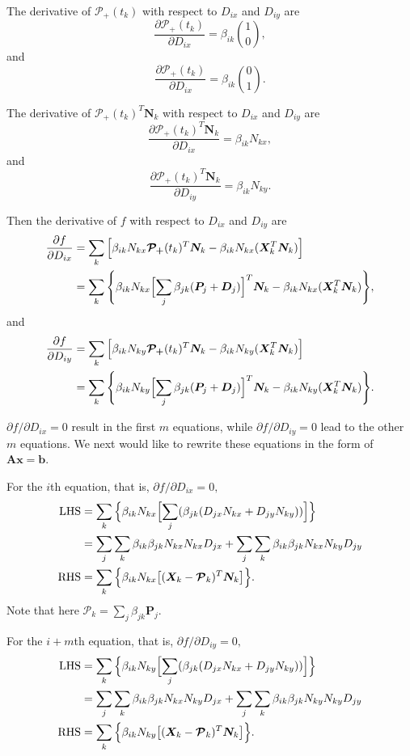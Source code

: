 \documentclass[11pt]{article}
\newcommand{\bmmpp}{\bm{\mathcal{P_+}}} %
\newcommand{\splinepk}{\sum_j{\beta_{jk}(\bm{P}_j+\bm{D}_j)}}
\newcommand{\splinek}{\sum_j{\beta_{jk}\bm{P}_j}}
\newcommand{\vX}[1]{\bm{X}_{#1}} %
\newcommand{\vN}[1]{\bm{N}_{#1}} %
\newcommand{\vP}[1]{\bm{\mathcal{P}}_{#1}} %
\newcommand{\mA}{\mathbf{A}} %
\newcommand{\mx}{\mathbf{x}} %
\newcommand{\mb}{\mathbf{b}} %
\newcommand{\rhs}{\mathrm{RHS}}
\newcommand{\lhs}{\mathrm{LHS}}
\renewcommand{\b}[1]{\beta_{#1}}
\begin{document}
The derivative of $\bmmpp(t_k)$ with respect to $D_{ix}$ and $D_{iy}$ are 
\[
\frac{\partial\bmmpp(t_k)}{\partial D_{ix}}=\b{ik} \binom 10,
\]
and
\[
\frac{\partial\bmmpp(t_k)}{\partial D_{ix}}=\b{ik} \binom 01.
\]


The derivative of $\bmmpp(t_k)^T\vN{k}$ with respect to $D_{ix}$ and $D_{iy}$ are 
\[
\frac{\partial\bmmpp(t_k)^T\vN{k}}{\partial D_{ix}}=\b{ik} N_{kx},
\]
and
\[
\frac{\partial\bmmpp(t_k)^T\vN{k}}{\partial D_{iy}}=\b{ik} N_{ky}.
\]

Then the derivative of $f$ with respect to $D_{ix}$ and $D_{iy}$ are 
\[
\begin{split}
\frac{\partial f}{\partial D_{ix}} &= \sum_k{\Bigl[ \b{ik} N_{kx}\bmmpp(t_k)^T\vN{k} - \b{ik} N_{kx}(\vX{k}^T\vN{k}) \Bigr]} \\
&= \sum_k{\Biggl\{ \b{ik} N_{kx}\Bigl[\splinepk\Bigr]^T\vN{k} - \b{ik} N_{kx}(\vX{k}^T\vN{k}) \Biggr\} },
\end{split}
\]
and
\[
\begin{split}
\frac{\partial f}{\partial D_{iy}} &= \sum_k{\Bigl[ \b{ik} N_{ky}\bmmpp(t_k)^T\vN{k} - \b{ik} N_{ky}(\vX{k}^T\vN{k}) \Bigr]} \\
&= \sum_k{\Biggl\{ \b{ik} N_{ky}\Bigl[\splinepk\Bigr]^T\vN{k} - \b{ik} N_{ky}(\vX{k}^T\vN{k}) \Biggr\} }.
\end{split}
\]

$\partial f/\partial D_{ix}=0$ result in the first $m$ equations, while $\partial f/\partial D_{iy}=0$ lead to the other $m$ equations. We next would like to rewrite these equations in the form of $\mA\mx=\mb$.

For the $i$th equation, that is, $\partial f/\partial D_{ix}=0,$
\[
\begin{split}
\lhs &= \sum_k{ \Bigl\{ \b{ik} N_{kx} \Bigl[ \sum_j(\b{jk}(D_{jx}N_{kx}+D_{jy}N_{ky})) \Bigr] \Bigr\} } \\
&= \sum_j{\sum_k{\b{ik}\b{jk} N_{kx}N_{kx}D_{jx}}} + \sum_j{\sum_k{\b{ik}\b{jk} N_{kx}N_{ky}D_{jy}}} \\
\rhs &= \sum_k{ \Bigl\{ \b{ik} N_{kx} \bigl[ (\vX{k}-\vP{k})^T\vN{k} \bigr] \Bigr\} }.
\end{split}
\]
Note that here $\vP{k}=\splinek$.

For the $i+m$th equation, that is, $\partial f/\partial D_{iy}=0,$
\[
\begin{split}
\lhs &= \sum_k{ \Bigl\{ \b{ik} N_{ky} \Bigl[ \sum_j(\b{jk}(D_{jx}N_{kx}+D_{jy}N_{ky})) \Bigr] \Bigr\} } \\
&= \sum_j{\sum_k{\b{ik}\b{jk} N_{kx}N_{ky}D_{jx}}} + \sum_j{\sum_k{\b{ik}\b{jk} N_{ky}N_{ky}D_{jy}}} \\
\rhs &= \sum_k{ \Bigl\{ \b{ik} N_{ky} \bigl[ (\vX{k}-\vP{k})^T\vN{k} \bigr] \Bigr\} }.
\end{split}
\]
\end{document}
